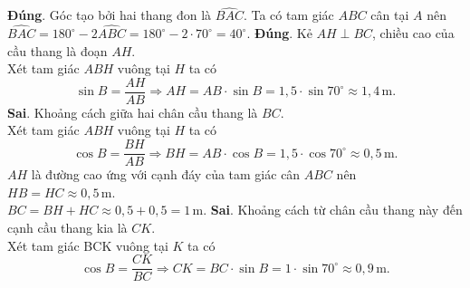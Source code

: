 \begin{ex}
{\begin{center}
	\end{center}
	\begin{itemchoice}
	\itemch \textbf{Đúng}. Góc tạo bởi hai thang đon là $\widehat{BAC}$. 
	Ta có tam giác $ABC$ cân tại $A$ nên $\widehat{BAC} = 180^\circ - 2\widehat{ABC} = 180^\circ - 2 \cdot 70^\circ = 40^\circ$. 
	\itemch \textbf{Đúng}. Kẻ $AH \perp BC$, chiều cao của cầu thang là đoạn $AH$.\\
	Xét tam giác $ABH$ vuông tại $H$ ta có 
	$$\sin B = \dfrac{AH}{AB} \Rightarrow AH = AB \cdot \sin B = 1{,}5 \cdot \sin 70^\circ \approx 1{,}4\,\mathrm{m}.$$ 
	\itemch \textbf{Sai}. Khoảng cách giữa hai chân cầu thang là $BC$.\\
	Xét tam giác $ABH$ vuông tại $H$ ta có 
	$$\cos B = \dfrac{BH}{AB} \Rightarrow BH = AB \cdot \cos B = 1{,}5 \cdot \cos 70^\circ \approx 0{,}5\,\mathrm{m}.$$
	$AH$ là đường cao ứng với cạnh đáy của tam giác cân $ABC$ nên $HB = HC \approx 0{,}5\,\mathrm{m}$.\\
	$BC = BH + HC \approx 0{,}5 + 0{,}5 = 1\,\mathrm{m}$. 
	\itemch \textbf{Sai}. Khoảng cách từ chân cầu thang này đến cạnh cầu thang kia là $CK$.\\
	Xét tam giác BCK vuông tại $K$ ta có 
	$$\cos B = \dfrac{CK}{BC} \Rightarrow CK = BC \cdot \sin B = 1 \cdot \sin 70^\circ \approx 0{,}9\,\mathrm{m}.$$
	\end{itemchoice}
	}
\end{ex}
